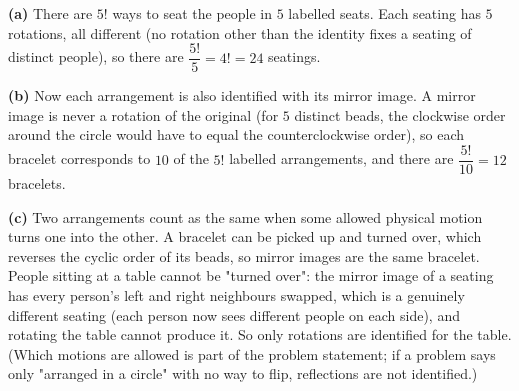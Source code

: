 \textbf{(a)} There are $5!$ ways to seat the people in $5$ labelled seats. Each seating has $5$ rotations, all different (no rotation other than the identity fixes a seating of distinct people), so there are $\dfrac{5!}{5}=4!=\boxed{24}$ seatings.

\textbf{(b)} Now each arrangement is also identified with its mirror image. A mirror image is never a rotation of the original (for $5$ distinct beads, the clockwise order around the circle would have to equal the counterclockwise order), so each bracelet corresponds to $10$ of the $5!$ labelled arrangements, and there are $\dfrac{5!}{10}=\boxed{12}$ bracelets.

\textbf{(c)} Two arrangements count as the same when some allowed physical motion turns one into the other. A bracelet can be picked up and turned over, which reverses the cyclic order of its beads, so mirror images are the same bracelet. People sitting at a table cannot be "turned over": the mirror image of a seating has every person's left and right neighbours swapped, which is a genuinely different seating (each person now sees different people on each side), and rotating the table cannot produce it. So only rotations are identified for the table. (Which motions are allowed is part of the problem statement; if a problem says only "arranged in a circle" with no way to flip, reflections are not identified.)
